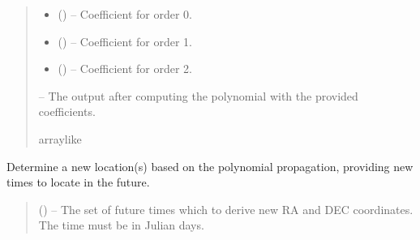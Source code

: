 \documentclass[letterpaper,11pt,english]{sphinxmanual}
\begin{document}
\begin{savenotes}
\begin{fulllineitems}
\begin{savenotes}
\begin{fulllineitems}
\begin{quote}
\begin{description}
\begin{itemize}
\item {} 
\sphinxAtStartPar
{} () – Coefficient for order 0.

\item {} 
\sphinxAtStartPar
{} () – Coefficient for order 1.

\item {} 
\sphinxAtStartPar
{} () – Coefficient for order 2.

\end{itemize}

\sphinxAtStartPar
{} – The output after computing the polynomial with the provided
coefficients.

\sphinxAtStartPar
array\sphinxhyphen{}like

\end{description}\end{quote}

\end{fulllineitems}\end{savenotes}


\begin{savenotes}\begin{fulllineitems}
\label{\detokenize{code/opihiexarata.propagate.polynomial:opihiexarata.propagate.polynomial.QuadraticPropagationEngine.forward_propagate}}
\pysigstartsignatures
{}
\pysigstopsignatures
\sphinxAtStartPar
Determine a new location(s) based on the polynomial propagation,
providing new times to locate in the future.
\begin{quote}\begin{description}
\sphinxAtStartPar
{} () – The set of future times which to derive new RA and DEC coordinates.
The time must be in Julian days.


\end{description}
\end{quote}
\end{fulllineitems}
\end{savenotes}
\end{fulllineitems}
\end{savenotes}
\end{document}
